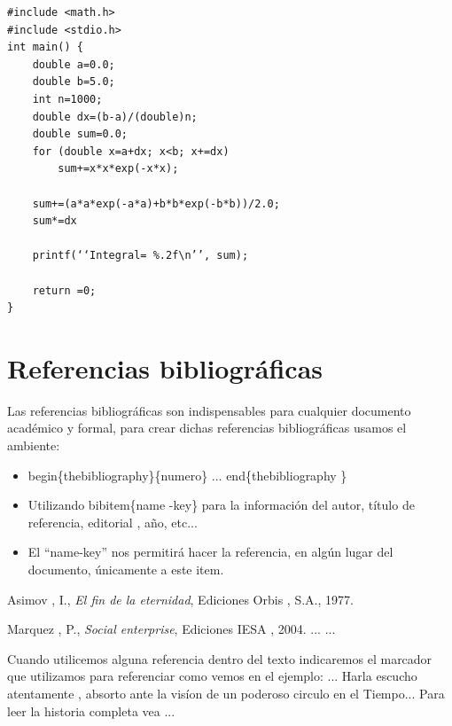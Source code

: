 \documentclass{article}
\begin{document}
\medskip 
\begin{verbatim} 
#include <math.h> 
#include <stdio.h> 
int main() { 
    double a=0.0; 
    double b=5.0; 
    int n=1000; 	
    double dx=(b-a)/(double)n; 
    double sum=0.0; 
    for (double x=a+dx; x<b; x+=dx) 
        sum+=x*x*exp(-x*x); 
	
    sum+=(a*a*exp(-a*a)+b*b*exp(-b*b))/2.0; 
    sum*=dx 

    printf(‘‘Integral= %.2f\n’’, sum); 

    return =0; 
} 
\end{verbatim} 


\section{Referencias bibliogr\'aficas} 
Las referencias bibliogr\'aficas son indispensables para cualquier documento acad\'emico y formal, 
para crear dichas referencias bibliogr\'aficas usamos el ambiente: 
\begin{itemize} 
\item \dinv begin\{thebibliography\}\{numero\} ... \dinv end\{thebibliography \} 
\item Utilizando \dinv bibitem\{name -key\} para la informaci\'on del autor, t\'itulo de referencia,
editorial , a\~no, etc... 
\item El ``name-key'' nos permitir\'a hacer la referencia, en alg\'un lugar del documento, \'unicamente a 
este item. 
\end{itemize} 

\begin{thebibliography}{3} 
 Asimov , I., 
{\it El fin de la eternidad}, 
Ediciones Orbis , S.A., 1977. 

 Marquez , P., 
{\it Social enterprise}, 
Ediciones IESA , 2004. 
 ... ... 
\end{thebibliography} 


Cuando utilicemos alguna referencia dentro del texto indicaremos el marcador que utilizamos para 
referenciar como vemos en el ejemplo: 
\medskip 
... 
Harla escucho atentamente
 , absorto ante la vis\'ion 
de un poderoso circulo en 
el Tiempo... 
Para leer la historia 
completa vea \cite{asimov} 
...
\end{document}
